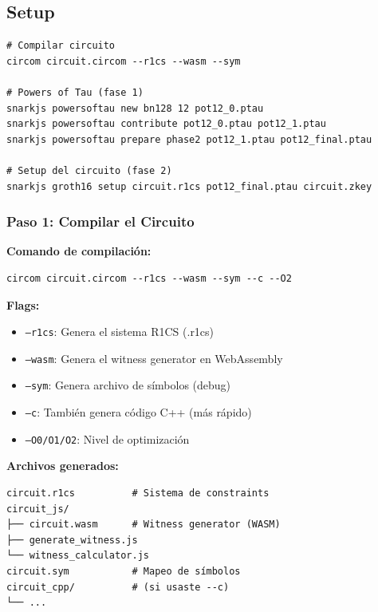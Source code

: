 \documentclass[11pt,a4paper,twoside,openright]{book}
\theoremstyle{definition}
\theoremstyle{plain}
\theoremstyle{remark}
\begin{document}
\subsection{Setup}

\begin{verbatim}
# Compilar circuito
circom circuit.circom --r1cs --wasm --sym

# Powers of Tau (fase 1)
snarkjs powersoftau new bn128 12 pot12_0.ptau
snarkjs powersoftau contribute pot12_0.ptau pot12_1.ptau
snarkjs powersoftau prepare phase2 pot12_1.ptau pot12_final.ptau

# Setup del circuito (fase 2)
snarkjs groth16 setup circuit.r1cs pot12_final.ptau circuit.zkey
\end{verbatim}

\subsubsection{Paso 1: Compilar el Circuito}

\begin{mathnote}
\textbf{Comando de compilación:}

\begin{verbatim}
circom circuit.circom --r1cs --wasm --sym --c --O2
\end{verbatim}

\textbf{Flags:}
\begin{itemize}
    \item \texttt{--r1cs}: Genera el sistema R1CS (.r1cs)
    \item \texttt{--wasm}: Genera el witness generator en WebAssembly
    \item \texttt{--sym}: Genera archivo de símbolos (debug)
    \item \texttt{--c}: También genera código C++ (más rápido)
    \item \texttt{--O0/O1/O2}: Nivel de optimización
\end{itemize}

\textbf{Archivos generados:}
\begin{verbatim}
circuit.r1cs          # Sistema de constraints
circuit_js/
├── circuit.wasm      # Witness generator (WASM)
├── generate_witness.js
└── witness_calculator.js
circuit.sym           # Mapeo de símbolos
circuit_cpp/          # (si usaste --c)
└── ...
\end{verbatim}
\end{mathnote}
\end{document}
